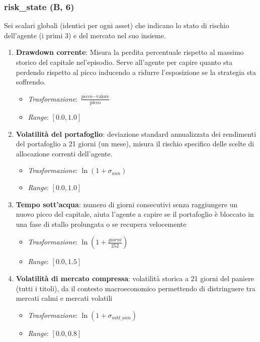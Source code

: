 \subsubsection{risk\_state (B, 6)}
Sei scalari globali (identici per ogni asset) che indicano lo stato di rischio dell'agente (i primi 3) e del mercato nel suo insieme.
\begin{enumerate}
    \item \textbf{Drawdown corrente}: Misura la perdita percentuale rispetto al massimo storico del capitale nel'episodio. Serve all'agente per capire quanto sta perdendo rispetto al picco inducendo a ridurre l'esposizione se la strategia sta soffrendo. 
        \begin{itemize}
    \item \textit{Trasformazione}: $\frac{\textit{picco} - \text{valore}}{\text{picco}}$
    \item \textit{Range}: $[0.0, 1.0]$
  \end{itemize}
    \item \textbf{Volatilità del portafoglio}: deviazione standard annualizzata dei rendimenti del portafoglio a 21 giorni (un mese), misura il rischio specifico delle scelte di allocazione correnti dell'agente.
       \begin{itemize}
    \item \textit{Trasformazione}: $\ln(1+ \sigma_{ann})$
    \item \textit{Range}: $[0.0, 1.0]$
  \end{itemize}
    \item \textbf{Tempo sott'acqua}: numero di giorni consecutivi senza raggiungere un nuovo picco del capitale, aiuta l'agente a capire se il portafoglio è bloccato in una fase di stallo prolungata o se recupera velocemente
    \begin{itemize}
    \item \textit{Trasformazione}: $\ln(1+ \frac{giorni}{252})$
    \item \textit{Range}: $[0.0,1.5]$
  \end{itemize}
    \item \textbf{Volatilità di mercato compressa}: volatilità storica a 21 giorni del paniere (tutti i titoli), da il contesto macroeconomico permettendo di distringuere tra mercati calmi e mercati volatili
    \begin{itemize}
    \item \textit{Trasformazione}: $\ln(1+\sigma_{mkt\_ann})$
    \item \textit{Range}: $[0.0, 0.8]$

\end{itemize}
\end{enumerate}
